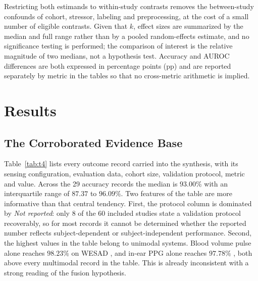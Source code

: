 \documentclass[11pt,a4paper]{article}
\begin{document}
Restricting both estimands to within-study contrasts removes the between-study confounds of
cohort, stressor, labeling and preprocessing, at the cost of a small number of eligible
contrasts. Given that $k$, effect sizes are summarized by the median and full range rather
than by a pooled random-effects estimate, and no significance testing is performed; the
comparison of interest is the relative magnitude of two medians, not a hypothesis test.
Accuracy and AUROC differences are both expressed in percentage points (pp) and are reported
separately by metric in the tables so that no cross-metric arithmetic is implied.

\section{Results}

\subsection{The Corroborated Evidence Base}
Table~\ref{tab:t4} lists every outcome record carried into the synthesis, with its sensing
configuration, evaluation data, cohort size, validation protocol, metric and value. Across
the 29 accuracy records the median is $93.00\%$ with an interquartile range of
$87.37$ to $96.09\%$. Two features of the table are more informative than that central
tendency. First, the protocol column is dominated by \textit{Not reported}: only 8 of the 60
included studies state a validation protocol recoverably, so for most records it cannot be
determined whether the reported number reflects subject-dependent or subject-independent
performance. Second, the highest values in the table belong to unimodal systems. Blood volume
pulse alone reaches $98.23\%$ on WESAD \cite{r50}, and in-ear PPG alone reaches $97.78\%$
\cite{r43}, both above every multimodal record in the table. This is already inconsistent
with a strong reading of the fusion hypothesis.
\end{document}
